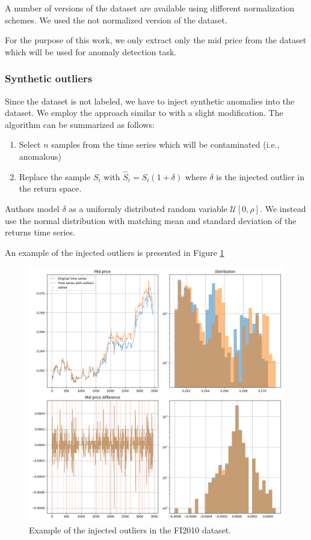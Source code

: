 \documentclass[a4paper, twoside]{report}
\theoremstyle{definition}
\numberwithin{equation}{section}
\begin{document}
A number of versions of the dataset are available using different normalization schemes. We used the not normalized version of the dataset.

For the purpose of this work, we only extract only the mid price from the dataset which will be used for anomaly detection task.


\subsubsection{Synthetic outliers}

Since the dataset is not labeled, we have to inject synthetic anomalies into the dataset.
We employ the approach similar to \cite{Crepey2022Anomaly} with a slight modification.
The algorithm can be summarized as follows:
\begin{enumerate}
    \item Select $n$ samples from the time series which will be contaminated (i.e., anomalous)
    \item Replace the sample $S_i$ with $\hat{S}_i=S_i(1+\delta)$ where $\delta$ is the injected outlier in the return space.
\end{enumerate}

Authors model $\delta$ as a uniformly distributed random variable $\mathcal{U}[0, \rho]$.
We instead use the normal distribution with matching mean and standard deviation of the returns time series.

An example of the injected outliers is presented in Figure \ref{fig:FI2010_example_outliers_injected}
\begin{figure}[h!]
    \centering
    \includegraphics[scale=0.48]{FI2010_example_outliers_injected.png}
    \caption{Example of the injected outliers in the FI2010 dataset.}
    \label{fig:FI2010_example_outliers_injected}
\end{figure}
\end{document}
